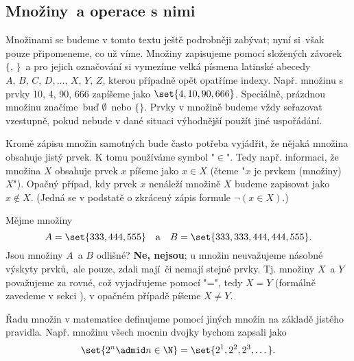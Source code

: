 \subsection{Množiny~a operace s nimi}\label{subsec:mnoziny_a_operace_s_nimi}

Množinami se budeme v tomto textu ještě podrobněji zabývat; nyní si~však pouze připomeneme, co už víme. Množiny zapisujeme pomocí složených závorek $\{,\,\}$~a pro jejich označování si vymezíme velká písmena latinské abecedy\linebreak $A,\,B,\,C,\,D,\dots,\,X,\,Y,\,Z$, kterou případně opět opatříme indexy. Např. množinu s prvky 10, 4, 90, 666 zapíšeme jako $\set{4, 10, 90, 666}$. Speciálně, prázdnou množinu značíme~buď $\emptyset$~nebo $\{\}$. Prvky v množině budeme vždy seřazovat vzestupně, pokud nebude v dané situaci výhodnější použít jiné uspořádání.\par
Kromě zápisu množin samotných bude často potřeba vyjádřit, že nějaká množina obsahuje jistý prvek. K tomu používáme symbol "$\in$". Tedy např. informaci, že množina $X$ obsahuje prvek $x$ píšeme jako $x\in X$ (čteme "$x$ je prvkem (množiny) $X$"). Opačný případ, kdy prvek $x$ nenáleží množině $X$ budeme zapisovat jako $x \notin X$. (Jedná se v podstatě o zkrácený zápis formule $\neg (x \in X)$.)\par
Mějme množiny
\begin{equation*}
    A=\set{333, 444, 555}\quad\text{a}\quad B=\set{333, 333, 444, 444, 555}.
\end{equation*}
Jsou množiny $A$~a $B$ odlišné? \textbf{Ne, nejsou}; u množin neuvažujeme násobné výskyty prvků,~ale pouze, zdali mají~či nemají stejné prvky. Tj. množiny $X$~a $Y$ považujeme za rovné, což vyjadřujeme pomocí "=", tedy $X=Y$ (formálně zavedeme v sekci ), v opačném případě píšeme $X \neq Y$.\par
Řadu množin v matematice definujeme pomocí jiných množin na základě jistého pravidla. Např. množinu všech mocnin dvojky bychom zapsali jako
\begin{equation*}
    \set{2^n \admid n \in \N}=\set{2^1, 2^2, 2^3, \dots}.
\end{equation*}

